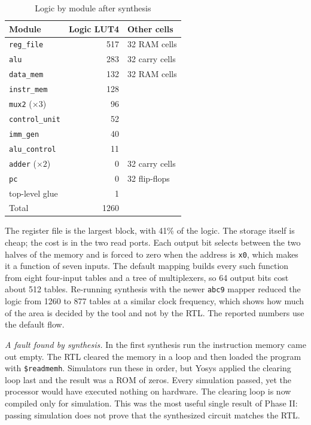 \documentclass[conference]{IEEEtran}
\begin{document}
\begin{table}[!htb]
\caption{Logic by module after synthesis}
\label{tab:modules}
\centering
\begin{tabular}{@{}lrl@{}}
\toprule
Module & Logic LUT4 & Other cells \\
\midrule
\texttt{reg\_file}      & 517 & 32 RAM cells \\
\texttt{alu}            & 283 & 32 carry cells \\
\texttt{data\_mem}      & 132 & 32 RAM cells \\
\texttt{instr\_mem}     & 128 & \\
\texttt{mux2} ($\times 3$) & 96 & \\
\texttt{control\_unit}  & 52  & \\
\texttt{imm\_gen}       & 40  & \\
\texttt{alu\_control}   & 11  & \\
\texttt{adder} ($\times 2$) & 0 & 32 carry cells \\
\texttt{pc}             & 0   & 32 flip-flops \\
top-level glue          & 1   & \\
\midrule
Total                   & 1260 & \\
\bottomrule
\end{tabular}
\end{table}

The register file is the largest block, with 41\% of the logic. The storage
itself is cheap; the cost is in the two read ports. Each output bit selects
between the two halves of the memory and is forced to zero when the address
is \texttt{x0}, which makes it a function of seven inputs. The default
mapping builds every such function from eight four-input tables and a tree
of multiplexers, so 64 output bits cost about 512 tables. Re-running
synthesis with the newer \texttt{abc9} mapper reduced the logic from 1260 to
877 tables at a similar clock frequency, which shows how much of the area is
decided by the tool and not by the RTL. The reported numbers use the default
flow.

\textit{A fault found by synthesis.} In the first synthesis run the
instruction memory came out empty. The RTL cleared the memory in a loop and
then loaded the program with \texttt{\$readmemh}. Simulators run these in
order, but Yosys applied the clearing loop last and the result was a ROM of
zeros. Every simulation passed, yet the processor would have executed
nothing on hardware. The clearing loop is now compiled only for simulation.
This was the most useful single result of Phase II: passing simulation does
not prove that the synthesized circuit matches the RTL.
\end{document}
